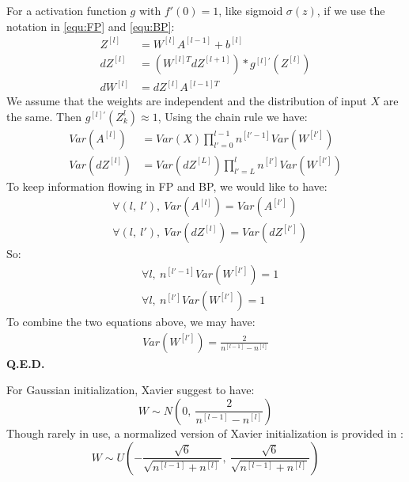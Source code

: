 \begin{prf}
    For a activation function $ g $ with $ f'(0) = 1 $, like sigmoid $ \sigma(z) $,
    if we use the notation in \autoref{equ:FP} and \autoref{equ:BP}:
    \begin{align*}
        Z^{[l]} & = W^{[l]}A^{[l-1]} + b^{[l]} \\
        dZ^{[l]} & = (W^{[l]T}dZ^{[l+1]})*g^{[l]'}(Z^{[l]}) \\
        dW^{[l]} & = dZ^{[l]}A^{[l-1]T}
    \end{align*} 
    We assume that the weights are independent and the distribution of 
    input $ X $ are the same. Then $ g^{[l]'}(Z_k^{l}) \approx 1 $, Using the 
    chain rule we have:
    \begin{align}
        Var(A^{[l]}) & = Var(X)\prod\limits_{l'=0}^{l-1}n^{[l'-1]}Var(W^{[l']}) \\
        Var(dZ^{[l]}) & = Var(dZ^{[L]})\prod\limits_{l'=L}^{l}n^{[l']}Var(W^{[l']})
    \end{align}
    To keep information flowing in FP and BP, we would like to have:
    \begin{align}
        & \forall(l,\ l'),\ Var(A^{[l]}) = Var(A^{[l']}) \\
        & \forall(l,\ l'),\ Var(dZ^{[l]}) = Var(dZ^{[l']})
    \end{align}
    So:
    \begin{align}
        & \forall l,\ n^{[l'-1]}Var(W^{[l']}) = 1 \\
        & \forall l,\ n^{[l']}Var(W^{[l']}) = 1
    \end{align}
    To combine the two equations above, we may have:
    \begin{eqnarray}
        Var(W^{[l']}) = \frac{2}{n^{[l-1]} - n^{[l]}}
    \end{eqnarray}
    \textbf{Q.E.D.}
\end{prf}
\par For Gaussian initialization, Xavier suggest to have:
\begin{equation}
    W \sim N(0,\ \frac{2}{n^{[l-1]} - n^{[l]}})
\end{equation}
Though rarely in use, a normalized version of Xavier initialization is 
provided in \parencite{glorot2010understanding}:
\begin{equation}
    W \sim U(-\frac{\sqrt{6}}{\sqrt{n^{[l-1]} + n^{[l]}}},\ \frac{\sqrt{6}}{\sqrt{n^{[l-1]} + n^{[l]}}})
\end{equation}

